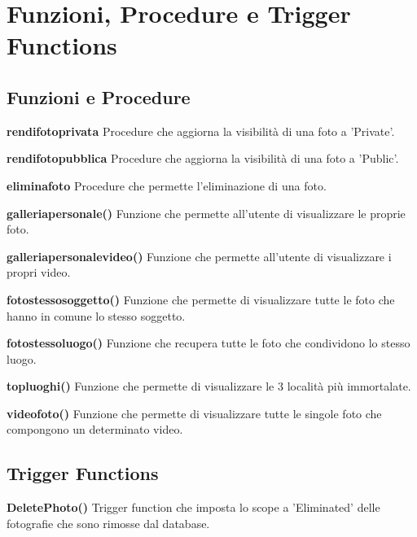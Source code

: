 \pagebreak
\section{Funzioni, Procedure e Trigger Functions}

\vspace{2em}

\subsection{Funzioni e Procedure}

\vspace{2em}

\textbf{rendi\textunderscore foto\textunderscore privata}
\break
Procedure che aggiorna la visibilità di una foto a 'Private'.
\break

\textbf{rendi\textunderscore foto\textunderscore pubblica}
\break
Procedure che aggiorna la visibilità di una foto a 'Public'.
\break

\textbf{elimina\textunderscore foto}
\break
Procedure che permette l'eliminazione di una foto.
\break

\textbf{galleriapersonale()}
\break
Funzione che permette all'utente di visualizzare le proprie foto.
\break

\textbf{galleriapersonalevideo()}
\break
Funzione che permette all'utente di visualizzare i propri video.
\break

\textbf{foto\textunderscore stesso\textunderscore soggetto()}
\break
Funzione che permette di visualizzare tutte le foto che hanno in comune lo stesso soggetto.
\break

\textbf{foto\textunderscore stesso\textunderscore luogo()}
\break
Funzione che recupera tutte le foto che condividono lo stesso luogo.
\break

\textbf{top\textunderscore luoghi()}
\break
Funzione che permette di visualizzare le 3 località più immortalate.
\break

\textbf{video\textunderscore foto()}
\break
Funzione che permette di visualizzare tutte le singole foto che compongono un determinato video.
\break

\pagebreak

\subsection{Trigger Functions}

\vspace{2em}
\textbf{Delete\textunderscore Photo()}
\break
Trigger function che imposta lo scope a 'Eliminated' delle fotografie che sono rimosse dal database.
\break

